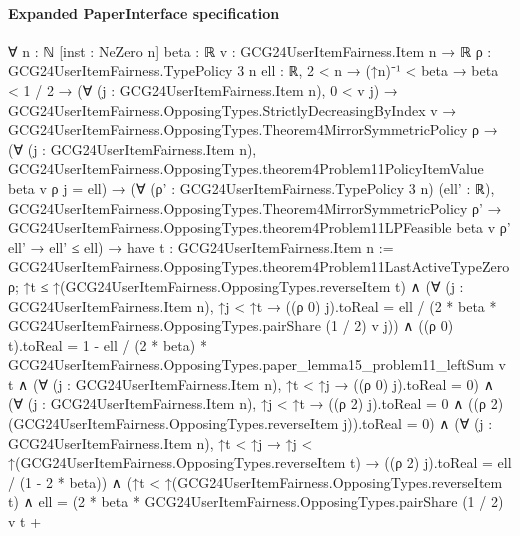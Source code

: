 \documentclass[10pt]{article}
\begin{document}
\paragraph{Expanded PaperInterface specification}
\begin{ReviewVerbatim}
∀ {n : ℕ} [inst : NeZero n] {beta : ℝ} {v : GCG24UserItemFairness.Item n → ℝ} {ρ : GCG24UserItemFairness.TypePolicy 3 n}
  {ell : ℝ},
  2 < n →
    (↑n)⁻¹ < beta →
      beta < 1 / 2 →
        (∀ (j : GCG24UserItemFairness.Item n), 0 < v j) →
          GCG24UserItemFairness.OpposingTypes.StrictlyDecreasingByIndex v →
            GCG24UserItemFairness.OpposingTypes.Theorem4MirrorSymmetricPolicy ρ →
              (∀ (j : GCG24UserItemFairness.Item n),
                  GCG24UserItemFairness.OpposingTypes.theorem4Problem11PolicyItemValue beta v ρ j = ell) →
                (∀ (ρ' : GCG24UserItemFairness.TypePolicy 3 n) (ell' : ℝ),
                    GCG24UserItemFairness.OpposingTypes.Theorem4MirrorSymmetricPolicy ρ' →
                      GCG24UserItemFairness.OpposingTypes.theorem4Problem11LPFeasible beta v ρ' ell' → ell' ≤ ell) →
                  have t : GCG24UserItemFairness.Item n :=
                    GCG24UserItemFairness.OpposingTypes.theorem4Problem11LastActiveTypeZero ρ;
                  ↑t ≤ ↑(GCG24UserItemFairness.OpposingTypes.reverseItem t) ∧
                    (∀ (j : GCG24UserItemFairness.Item n),
                        ↑j < ↑t →
                          ((ρ 0) j).toReal =
                            ell / (2 * beta * GCG24UserItemFairness.OpposingTypes.pairShare (1 / 2) v j)) ∧
                      ((ρ 0) t).toReal =
                          1 -
                            ell / (2 * beta) * GCG24UserItemFairness.OpposingTypes.paper_lemma15_problem11_leftSum v t ∧
                        (∀ (j : GCG24UserItemFairness.Item n), ↑t < ↑j → ((ρ 0) j).toReal = 0) ∧
                          (∀ (j : GCG24UserItemFairness.Item n),
                              ↑j < ↑t →
                                ((ρ 2) j).toReal = 0 ∧
                                  ((ρ 2) (GCG24UserItemFairness.OpposingTypes.reverseItem j)).toReal = 0) ∧
                            (∀ (j : GCG24UserItemFairness.Item n),
                                ↑t < ↑j →
                                  ↑j < ↑(GCG24UserItemFairness.OpposingTypes.reverseItem t) →
                                    ((ρ 2) j).toReal = ell / (1 - 2 * beta)) ∧
                              (↑t < ↑(GCG24UserItemFairness.OpposingTypes.reverseItem t) ∧
                                  ell =
                                      (2 * beta * GCG24UserItemFairness.OpposingTypes.pairShare (1 / 2) v t +

\end{ReviewVerbatim}
\end{document}
